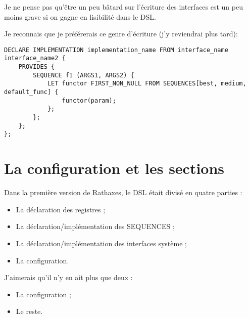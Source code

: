 \documentclass{rtxreport}
\begin{document}
Je ne pense pas qu’être un peu bâtard sur l’écriture des interfaces est un peu
moins grave si on gagne en lisibilité dans le DSL.

Je reconnais que je préférerais ce genre d’écriture (j'y reviendrai plus tard):

\begin{lstlisting}
DECLARE IMPLEMENTATION implementation_name FROM interface_name interface_name2 {
	PROVIDES {
		SEQUENCE f1 (ARGS1, ARGS2) {
			LET functor FIRST_NON_NULL FROM SEQUENCES[best, medium, default_func] {
				functor(param);
			};
		};
	};
};
\end{lstlisting}



\chapter{La configuration et les sections}

Dans la première version de Rathaxes, le DSL était divisé en quatre parties : 
\begin{itemize}
	\item La déclaration des registres ; 
	\item La déclaration/implémentation des SEQUENCES ; 
	\item La déclaration/implémentation des interfaces système ;
	\item La configuration. 
\end{itemize}

J’aimerais qu’il n’y en ait plus que deux : 
\begin{itemize}
	\item La configuration ; 
	\item Le reste. 
\end{itemize}
\end{document}
